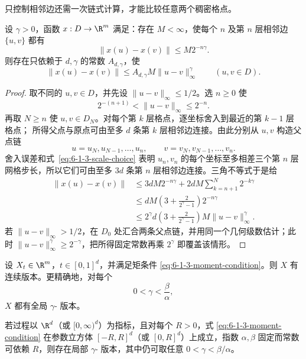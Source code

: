 只控制相邻边还需一次链式计算，才能比较任意两个稠密格点。

\begin{lemma}[二进链估计]\label{lemma:6-1-3-dyadic-chain}
设 $\gamma>0$，函数 $x:D\to\R^m$ 满足：存在 $M<\infty$，使每个 $n$ 及第 $n$ 层相邻边
$\{u,v\}$ 都有
\[
  \|x(u)-x(v)\|\le M2^{-n\gamma}.
\]
则存在只依赖于 $d,\gamma$ 的常数 $A_{d,\gamma}$，使
\[
  \|x(u)-x(v)\|
  \le A_{d,\gamma}M\|u-v\|_\infty^\gamma
  \qquad(u,v\in D).
  \tag{6.1.13}\label{eq:6-1-3-dyadic-chain}
\]
\end{lemma}

\begin{proof}
取不同的 $u,v\in D$，并先设 $\|u-v\|_\infty\le1/2$。选 $n\ge0$ 使
\[
  2^{-(n+1)}<\|u-v\|_\infty\le2^{-n}.
  \tag{6.1.14}\label{eq:6-1-3-scale-choice}
\]
再取 $N\ge n$ 使 $u,v\in D_N$。对每个第 $k$ 层格点，逐坐标舍入到最近的第 $k-1$ 层格点；
所得父点与原点可由至多 $d$ 条第 $k$ 层相邻边连接。由此分别从 $u,v$ 构造父点链
\[
 u=u_N,u_{N-1},\ldots,u_n,
 \qquad
 v=v_N,v_{N-1},\ldots,v_n.
\]
舍入误差和式~\eqref{eq:6-1-3-scale-choice} 表明 $u_n,v_n$ 的每个坐标至多相差三个第 $n$ 层
网格步长，所以它们可由至多 $3d$ 条第 $n$ 层相邻边连接。三角不等式于是给
\begin{align*}
 \|x(u)-x(v)\|
 &\le3dM2^{-n\gamma}
   +2dM\sum_{k=n+1}^N2^{-k\gamma}\\
 &\le dM\left(3+\frac{2}{2^\gamma-1}\right)2^{-n\gamma}\\
 &\le 2^\gamma d\left(3+\frac{2}{2^\gamma-1}\right)
 M\|u-v\|_\infty^\gamma.
\end{align*}
若 $\|u-v\|_\infty>1/2$，在 $D_0$ 处汇合两条父点链，并用同一个几何级数估计；此时
$\|u-v\|_\infty^\gamma\ge2^{-\gamma}$，把所得固定常数再乘 $2^\gamma$ 即覆盖该情形。
\end{proof}

\begin{theorem}\label{theorem:6-1-3-1}
设 $X_t\in\R^m$，$t\in[0,1]^d$，并满足矩条件
\eqref{eq:6-1-3-moment-condition}。则 $X$ 有连续版本。更精确地，对每个
\[
  0<\gamma<\frac{\beta}{\alpha},
\]
$X$ 都有全局 $\gamma$-\Holder{} 版本。

若过程以 $\R^d$（或 $[0,\infty)^d$）为指标，且对每个 $R>0$，式
\eqref{eq:6-1-3-moment-condition} 在参数立方体 $[-R,R]^d$（或 $[0,R]^d$）上成立，指数
$\alpha,\beta$ 固定而常数可依赖 $R$，则存在局部 $\gamma$-\Holder{} 版本，其中仍可取任意
$0<\gamma<\beta/\alpha$。
\end{theorem}

